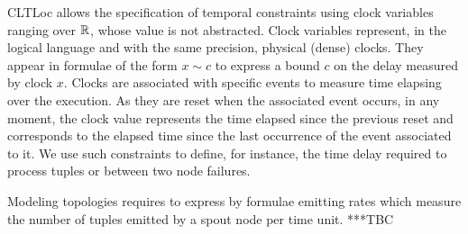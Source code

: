 CLTLoc allows the specification of temporal constraints using clock variables ranging over $\mathbb{R}$, whose value is not abstracted.
Clock variables represent, in the logical language and with the same precision, physical (dense) clocks.
They appear in formulae of the form $x \sim c$ to express a bound $c$ on the delay measured by clock $x$. 
Clocks are associated with specific events to measure time elapsing over the execution.
As they are reset when the associated event occurs, in any moment, the clock value represents the time elapsed since the previous reset and corresponds to the elapsed time since the last occurrence of the event associated to it.
We use such constraints to define, for instance, the time delay required to process tuples or between two node failures.

Modeling topologies requires to express by formulae emitting rates which measure the number of tuples emitted by a spout node per time unit.
***TBC